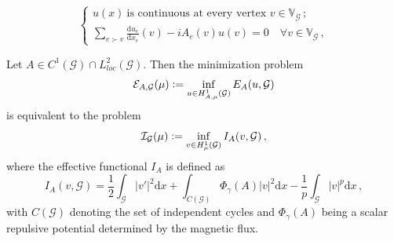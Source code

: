 \documentclass[10pt,a4paper]{amsart}
\newcommand{\defeq}{\vcentcolon=}
\begin{document}
\begin{equation}
    \label{bc}
    \begin{cases}
        u(x) \ \text{is continuous at every vertex } v \in \mathbb{V}_\mathcal{G}\,; \\
        \sum_{e \succ v} \frac{\textrm{d} u_e}{\textrm{d}x_e}(v) - i A_e(v) u(v) = 0 \quad \forall v \in \mathbb{V}_\mathcal{G}\,,
    \end{cases}   
\end{equation}

\begin{proposition} \label{equivalence}
Let $A \in C^1(\mathcal{G}) \cap L^2_{loc}(\mathcal{G})$. Then the minimization problem
    \begin{equation}
         \mathcal{E}_{A,\mathcal{G}}(\mu) \defeq \inf_{u \in H^1_{A,\mu}(\mathcal{G})} E_A(u, \mathcal{G})
    \end{equation}
    is equivalent to the problem
    \begin{equation}
        \mathcal{I}_\mathcal{G}(\mu) \defeq \inf_{v \in H^1_{\mu}(\mathcal{G})} I_A(v, \mathcal{G})\,,
        \label{Ig2}
    \end{equation}
    where the effective functional $I_A$ is defined as
    \begin{equation} \label{Ia}
        I_A(v,\mathcal{G})  = \frac{1}{2}\int_{\mathcal{G}} |v'|^2 \mathrm{d}x + \int_{C(\mathcal{G})} \Phi_{\gamma}(A) |v|^2 \mathrm{d}x - \frac{1}{p} \int_{\mathcal{G}} |v|^p \mathrm{d}x\,,
    \end{equation}
    with $C(\mathcal{G})$ denoting the set of independent cycles and $\Phi_{\gamma}(A)$ being a scalar repulsive potential determined by the magnetic flux.
\end{proposition}
\end{document}

